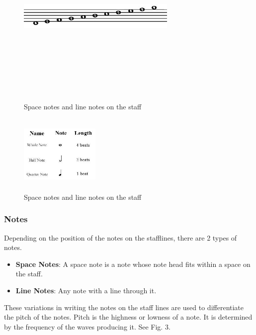 \documentclass[journal]{IEEEtran}
\begin{document}
\begin{figure}
\includegraphics[width=3in,height=3.5in,clip,keepaspectratio]{resources/images/notes}
\centering
\caption{Space notes and line notes on the staff}
\end{figure}

\begin{figure}
\includegraphics[width=1.5in,height=1.5in,clip,keepaspectratio]{resources/images/note_types}
\centering
\caption{Space notes and line notes on the staff}
\end{figure}

\subsubsection{Notes}
Depending on the position of the notes on the stafflines, there are 2 types of notes. 
\begin{itemize}
  \item \textbf{Space Notes}: A space note is a note whose note head fits within a space on the staff.
  \item \textbf{Line Notes}: Any note with a line through it.
\end{itemize}
These variations in writing the notes on the staff lines are used to differentiate the pitch of the
notes. Pitch is the highness or lowness of a note. It is determined by the frequency of the waves
producing it. See Fig. 3.
\end{document}
